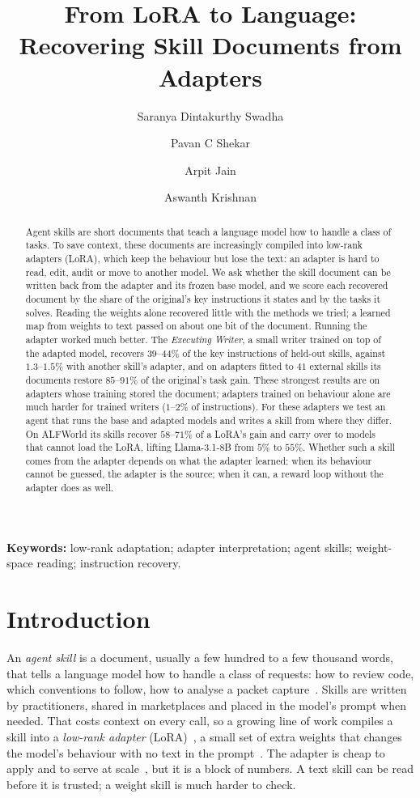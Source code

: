 \documentclass[11pt]{article}
\title{\bf From LoRA to Language:\\
Recovering Skill Documents from Adapters}
\author{Saranya Dintakurthy Swadha}
\author{Pavan C Shekar}
\author{Arpit Jain}
\author{Aswanth Krishnan}
\affil{QpiAI, Bengaluru, India}
\affil{\normalsize\texttt{\{saranya.d, pavan.s, arpit.j, ashwanth.krishnan\}@qpiai.tech}}
\date{}
\begin{document}
\maketitle

\begin{abstract}
Agent skills are short documents that teach a language model how to handle a class of tasks. To save context, these documents are
increasingly compiled into low-rank adapters (LoRA), which keep the behaviour but lose the text: an adapter is hard to read, edit, audit or
move to another model. We ask whether the skill document can be written back from the adapter and its frozen base model, and we score each
recovered document by the share of the original's key instructions it states and by the tasks it solves. Reading the weights alone recovered
little with the methods we tried; a learned map from weights to text passed on about one bit of the document. Running the adapter worked much
better. The \emph{Executing Writer}, a small writer trained on top of the adapted model, recovers $39$--$44\%$ of the key instructions of
held-out skills, against $1.3$--$1.5\%$ with another skill's adapter, and on adapters fitted to $41$ external skills its documents restore
$85$--$91\%$ of the original's task gain. These strongest results are on adapters whose training stored the document; adapters trained on
behaviour alone are much harder for trained writers ($1$--$2\%$ of instructions). For these adapters
we test an agent that runs the base and adapted models and writes a skill from where they differ. On ALFWorld its skills recover $58$--$71\%$
of a LoRA's gain and carry over to models that cannot load the LoRA, lifting Llama-3.1-8B from $5\%$ to $55\%$. Whether such a skill comes from
the adapter depends on what the adapter learned: when its behaviour cannot be guessed, the adapter is the source; when it can, a reward loop
without the adapter does as well.
\end{abstract}

\noindent\textbf{Keywords:} low-rank adaptation; adapter interpretation; agent skills; weight-space reading; instruction recovery.

\section{Introduction}

An \emph{agent skill} is a document, usually a few hundred to a few thousand words, that tells a language model how to handle a class of
requests: how to review code, which conventions to follow, how to analyse a packet capture~\cite{anthropicskills,skillsbench}. Skills are
written by practitioners, shared in marketplaces and placed in the model's prompt when needed. That costs context on every call, so a growing
line of work compiles a skill into a \emph{low-rank adapter} (LoRA)~\cite{lora}, a small set of extra weights that changes the model's behaviour
with no text in the prompt~\cite{t2l,d2l,shine,latentskill,paramskills}. The adapter is cheap to apply and to serve at scale~\cite{slora}, but it
is a block of numbers. A text skill can be read before it is trusted; a weight skill is much harder to check.
\end{document}
